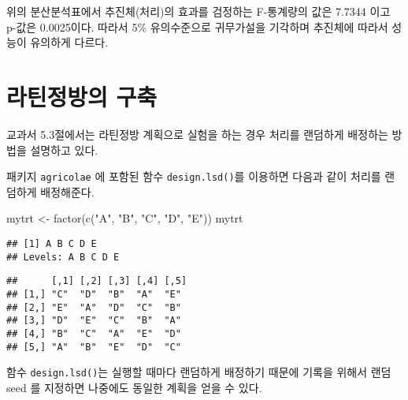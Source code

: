\documentclass[
]{book}
\newenvironment{Shaded}{\begin{snugshade}}{\end{snugshade}}
\newcommand{\AttributeTok}[1]{\textcolor[rgb]{0.77,0.63,0.00}{#1}}
\newcommand{\DecValTok}[1]{\textcolor[rgb]{0.00,0.00,0.81}{#1}}
\newcommand{\FunctionTok}[1]{\textcolor[rgb]{0.00,0.00,0.00}{#1}}
\newcommand{\NormalTok}[1]{#1}
\newcommand{\OtherTok}[1]{\textcolor[rgb]{0.56,0.35,0.01}{#1}}
\newcommand{\SpecialCharTok}[1]{\textcolor[rgb]{0.00,0.00,0.00}{#1}}
\newcommand{\StringTok}[1]{\textcolor[rgb]{0.31,0.60,0.02}{#1}}
\begin{document}
위의 분산분석표에서 추진체(처리)의 효과를 검정하는 F-통계량의 값은 7.7344 이고 p-값은 0.0025이다. 따라서 5\% 유의수준으로 귀무가설을 기각하며 추진체에 따라서 성능이 유의하게 다르다.

\hypertarget{uxb77cuxd2f4uxc815uxbc29uxc758-uxad6cuxcd95}{%
\section{라틴정방의 구축}\label{uxb77cuxd2f4uxc815uxbc29uxc758-uxad6cuxcd95}}

교과서 5.3절에서는 라틴정방 계획으로 실험을 하는 경우 처리를 랜덤하게 배정하는 방법을 설명하고 있다.

패키지 \texttt{agricolae} 에 포함된 함수 \texttt{design.lsd()}를 이용하면 다음과 같이 처리를 랜덤하게 배정해준다.

\begin{Shaded}
\begin{Highlighting}[]
\NormalTok{mytrt }\OtherTok{\textless{}{-}} \FunctionTok{factor}\NormalTok{(}\FunctionTok{c}\NormalTok{(}\StringTok{"A"}\NormalTok{, }\StringTok{"B"}\NormalTok{, }\StringTok{"C"}\NormalTok{, }\StringTok{"D"}\NormalTok{, }\StringTok{"E"}\NormalTok{))}
\NormalTok{mytrt}
\end{Highlighting}
\end{Shaded}

\begin{verbatim}
## [1] A B C D E
## Levels: A B C D E
\end{verbatim}

\begin{Shaded}
\end{Shaded}

\begin{verbatim}
##      [,1] [,2] [,3] [,4] [,5]
## [1,] "C"  "D"  "B"  "A"  "E" 
## [2,] "E"  "A"  "D"  "C"  "B" 
## [3,] "D"  "E"  "C"  "B"  "A" 
## [4,] "B"  "C"  "A"  "E"  "D" 
## [5,] "A"  "B"  "E"  "D"  "C"
\end{verbatim}

함수 \texttt{design.lsd()}는 실행할 때마다 랜덤하게 배정하기 때문에 기록을 위해서 랜덤 seed 를 지정하면
나중에도 동일한 계획을 얻을 수 있다.

\begin{Shaded}
\end{Shaded}
\end{document}
